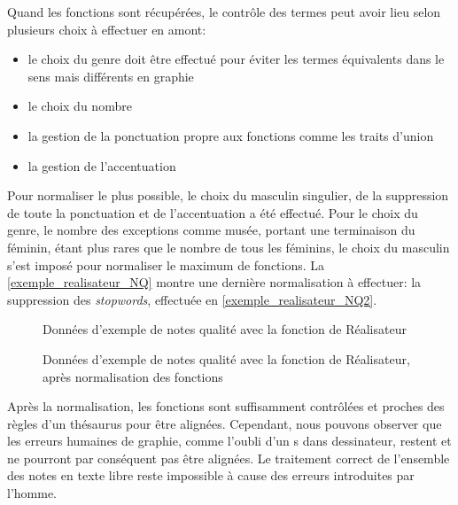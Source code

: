 Quand les fonctions sont récupérées, le contrôle des termes peut avoir lieu selon plusieurs choix à effectuer en amont:
\begin{itemize}
	\item le choix du genre doit être effectué pour éviter les termes équivalents dans le sens mais différents en graphie
	\item le choix du nombre
	\item la gestion de la ponctuation propre aux fonctions comme les traits d'union
	\item la gestion de l'accentuation
\end{itemize}
Pour normaliser le plus possible, le choix du masculin singulier, de la suppression de toute la ponctuation et de l'accentuation a été effectué. Pour le choix du genre, le nombre des exceptions comme \og musée\fg{}, portant une terminaison du féminin, étant plus rares que le nombre de tous les féminins, le choix du masculin s'est imposé pour normaliser le maximum de fonctions. La \autoref{exemple_realisateur_NQ} montre une dernière normalisation à effectuer: la suppression des \textit{stopwords}, effectuée en \autoref{exemple_realisateur_NQ2}.
\begin{figure}[!h]
	\centering
	\caption{Données d'exemple de notes qualité avec la fonction de Réalisateur}
	\label{exemple_realisateur_NQ}
\end{figure}
\begin{figure}[!h]
	\centering
	\caption{Données d'exemple de notes qualité avec la fonction de Réalisateur, après normalisation des fonctions}
	\label{exemple_realisateur_NQ2}
\end{figure}
\bigskip

Après la normalisation, les fonctions sont suffisamment contrôlées et proches des règles d'un thésaurus pour être alignées. Cependant, nous pouvons observer que les erreurs humaines de graphie, comme l'oubli d'un \og s\fg{} dans \og dessinateur\fg{}, restent et ne pourront par conséquent pas être alignées. Le traitement correct de l'ensemble des notes en texte libre reste impossible à cause des erreurs introduites par l'homme.\\

